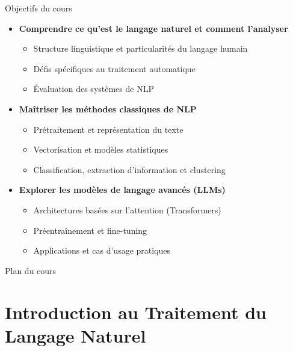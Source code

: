 \documentclass[aspectratio=169,11pt]{beamer}
\begin{document}
\begin{frame}{Objectifs du cours}
    \begin{itemize}
        \item \textbf{Comprendre ce qu'est le langage naturel et comment l'analyser}
        \begin{itemize}
            \item Structure linguistique et particularités du langage humain
            \item Défis spécifiques au traitement automatique
            \item Évaluation des systèmes de NLP
        \end{itemize}
        \vspace{0.3cm}
        \item \textbf{Maîtriser les méthodes classiques de NLP}
        \begin{itemize}
            \item Prétraitement et représentation du texte
            \item Vectorisation et modèles statistiques
            \item Classification, extraction d'information et clustering
        \end{itemize}
        \vspace{0.3cm}
        \item \textbf{Explorer les modèles de langage avancés (LLMs)}
        \begin{itemize}
            \item Architectures basées sur l'attention (Transformers)
            \item Préentraînement et fine-tuning
            \item Applications et cas d'usage pratiques
        \end{itemize}
    \end{itemize}
\end{frame}

\begin{frame}{Plan du cours}
    \tableofcontents
\end{frame}

\section{Introduction au Traitement du Langage Naturel}
\end{document}
